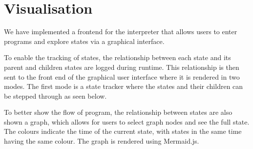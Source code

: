 \documentclass[12pt]{article}
\begin{document}
\section{Visualisation}
We have implemented a frontend for the interpreter that allows users to enter programs and explore states via a graphical interface.

To enable the tracking of states, the relationship between each state and its parent and children states are logged during runtime. This relationship is then sent to the front end of the graphical user interface where it is rendered in two modes. The first mode is a state tracker where the states and their children can be stepped through as seen below.

\begin{center}
\end{center}

To better show the flow of program, the relationship between states are also shown a graph, which allows for users to select graph nodes and see the full state. The colours indicate the time of the current state, with states in the same time having the same colour. The graph is rendered using Mermaid.js.

\begin{center}
\end{center}
\end{document}
